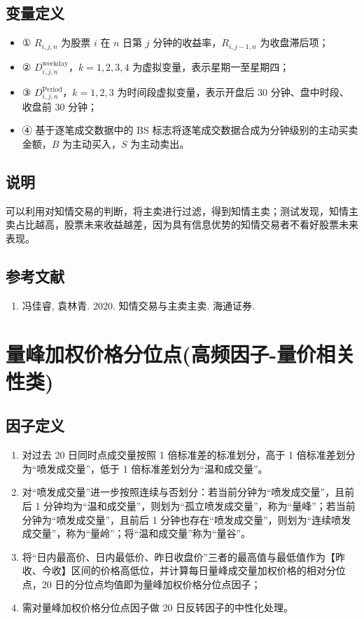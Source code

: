 \documentclass{article}
\begin{document}
\subsection{变量定义}
\begin{itemize}
    \item ① \( R_{i,j,n} \) 为股票 \( i \) 在 \( n \) 日第 \( j \) 分钟的收益率，\( R_{i,j-1,n} \) 为收盘滞后项；
    \item ② \( D_{i,j,n}^{\mathrm{weekday}} \)，\( k=1,2,3,4 \) 为虚拟变量，表示星期一至星期四；
    \item ③ \( D_{i,j,n}^{\mathrm{Period}} \)，\( k=1,2,3 \) 为时间段虚拟变量，表示开盘后 30 分钟、盘中时段、收盘前 30 分钟；
    \item ④ 基于逐笔成交数据中的 BS 标志将逐笔成交数据合成为分钟级别的主动买卖金额，\( B \) 为主动买入，\( S \) 为主动卖出。
\end{itemize}

\subsection{说明}
可以利用对知情交易的判断，将主卖进行过滤，得到知情主卖；测试发现，知情主卖占比越高，股票未来收益越差，因为具有信息优势的知情交易者不看好股票未来表现。

\subsection{参考文献}
\begin{enumerate}
    \item 冯佳睿, 袁林青. 2020. 知情交易与主卖主卖. 海通证券.
\end{enumerate}

\section{量峰加权价格分位点(高频因子-量价相关性类)}

\subsection{因子定义}
\begin{enumerate}
    \item 对过去 20 日同时点成交量按照 1 倍标准差的标准划分，高于 1 倍标准差划分为“喷发成交量”，低于 1 倍标准差划分为“温和成交量”。
    \item 对“喷发成交量”进一步按照连续与否划分：若当前分钟为“喷发成交量”，且前后 1 分钟均为“温和成交量”，则划为“孤立喷发成交量”，称为“量峰”；若当前分钟为“喷发成交量”，且前后 1 分钟也存在“喷发成交量”，则划为“连续喷发成交量”，称为“量岭”；将“温和成交量”称为“量谷”。
    \item 将“日内最高价、日内最低价、昨日收盘价”三者的最高值与最低值作为【昨收、今收】区间的价格高低位，并计算每日量峰成交量加权价格的相对分位点，20 日的分位点均值即为量峰加权价格分位点因子；
    \item 需对量峰加权价格分位点因子做 20 日反转因子的中性化处理。
\end{enumerate}
\end{document}
